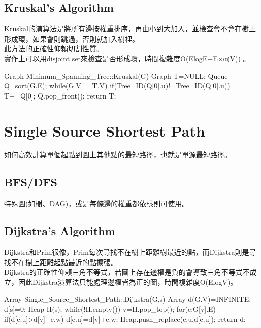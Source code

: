 \documentclass{article}
\begin{document}
\subsection{Kruskal's Algorithm }
Kruskal的演算法是將所有邊按權重排序，再由小到大加入，並檢查會不會在樹上形成環，如果會則跳過，否則就加入樹裡。\\
此方法的正確性仰賴切割性質。\\
實作上可以用disjoint set來檢查是否形成環，時間複雜度O(ElogE+E×α(V)) 。\\
\begin{algorithm}[caption={Kruskal's Algorithm}, label={alg1}]
Graph Minimum_Spanning_Tree::Kruskal(G)
    Graph T=NULL;
    Queue Q=sort(G.E);
    while(G.V==T.V)
        if(Tree_ID(Q[0].u)!=Tree_ID(Q[0].u))
            T+=Q[0];
        Q.pop_front();
    return T;
\end{algorithm}

\section{Single Source Shortest Path}
如何高效計算單個起點到圖上其他點的最短路徑，也就是單源最短路徑。\\
\subsection{BFS/DFS}
特殊圖(如樹、DAG)，或是每條邊的權重都依樣則可使用。\\
\subsection{Dijkstra's Algorithm}
Dijkstra和Prim很像，Prim每次尋找不在樹上距離樹最近的點，而Dijkstra則是尋找不在樹上距離起點最近的點擴張。\\
Dijkstra的正確性仰賴三角不等式，若圖上存在邊權是負的會導致三角不等式不成立，因此Dijkstra演算法只能處理邊權皆為正的圖，時間複雜度O(ElogV)。\\
\begin{algorithm}[caption={Dijkstra's Algorithm}, label={alg1}]
Array Single_Source_Shortest_Path::Dijkstra(G,s)
    Array d(G.V)=INFINITE;
    d[s]=0;
    Heap H(s);
    while(!H.empty())
        v=H.pop_top();
        for(e:G[v].E)
            if(d[e.u]>d[v]+e.w)
                d[e.u]=d[v]+e.w;
                Heap.push_replace(e.u,d[e.u]);
    return d;
\end{algorithm} 
\end{document}
